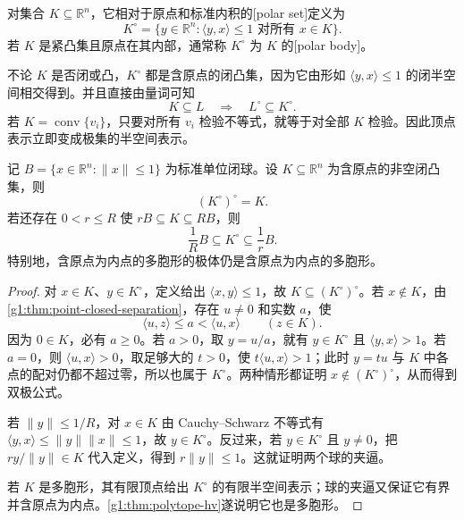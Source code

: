 \begin{definition}
	\label{g1:def:polar-body}
	对集合 \(K\subseteq\mathbb R^n\)，它相对于原点和标准内积的[polar set]定义为
	\[
		K^\circ=\{y\in\mathbb R^n:\langle y,x\rangle\le1\text{ 对所有 }x\in K\}.
	\]
	若 \(K\) 是紧凸集且原点在其内部，通常称 \(K^\circ\) 为 \(K\) 的[polar body]。
\end{definition}

不论 \(K\) 是否闭或凸，\(K^\circ\) 都是含原点的闭凸集，因为它由形如 \(\langle y,x\rangle\le1\) 的闭半空间相交得到。并且直接由量词可知
\begin{equation}
	\label{g1:eq:polar-inclusion}
	K\subseteq L\quad\Longrightarrow\quad L^\circ\subseteq K^\circ.
\end{equation}
若 \(K=\operatorname{conv}\{v_i\}\)，只要对所有 \(v_i\) 检验不等式，就等于对全部 \(K\) 检验。因此顶点表示立即变成极集的半空间表示。

\begin{theorem}
	\label{g1:thm:bipolar}
	记 \(B=\{x\in\mathbb R^n:\lVert x\rVert\le1\}\) 为标准单位闭球。设 \(K\subseteq\mathbb R^n\) 为含原点的非空闭凸集，则
	\[
		(K^\circ)^\circ=K.
	\]
	若还存在 \(0<r\le R\) 使 \(rB\subseteq K\subseteq RB\)，则
	\[
		\frac1R B\subseteq K^\circ\subseteq\frac1r B.
	\]
	特别地，含原点为内点的多胞形的极体仍是含原点为内点的多胞形。
\end{theorem}

\begin{proof}
	对 \(x\in K\)、\(y\in K^\circ\)，定义给出 \(\langle x,y\rangle\le1\)，故 \(K\subseteq(K^\circ)^\circ\)。若 \(x\notin K\)，由\cref{g1:thm:point-closed-separation}，存在 \(u\ne0\) 和实数 \(a\)，使
	\[
		\langle u,z\rangle\le a<\langle u,x\rangle\qquad(z\in K).
	\]
	因为 \(0\in K\)，必有 \(a\ge0\)。若 \(a>0\)，取 \(y=u/a\)，就有 \(y\in K^\circ\) 且 \(\langle y,x\rangle>1\)。若 \(a=0\)，则 \(\langle u,x\rangle>0\)，取足够大的 \(t>0\)，使 \(t\langle u,x\rangle>1\)；此时 \(y=tu\) 与 \(K\) 中各点的配对仍都不超过零，所以也属于 \(K^\circ\)。两种情形都证明 \(x\notin(K^\circ)^\circ\)，从而得到双极公式。

	若 \(\lVert y\rVert\le1/R\)，对 \(x\in K\) 由 Cauchy--Schwarz 不等式有 \(\langle y,x\rangle\le\lVert y\rVert\lVert x\rVert\le1\)，故 \(y\in K^\circ\)。反过来，若 \(y\in K^\circ\) 且 \(y\ne0\)，把 \(ry/\lVert y\rVert\in K\) 代入定义，得到 \(r\lVert y\rVert\le1\)。这就证明两个球的夹逼。

	若 \(K\) 是多胞形，其有限顶点给出 \(K^\circ\) 的有限半空间表示；球的夹逼又保证它有界并含原点为内点。\cref{g1:thm:polytope-hv}遂说明它也是多胞形。
\end{proof}

